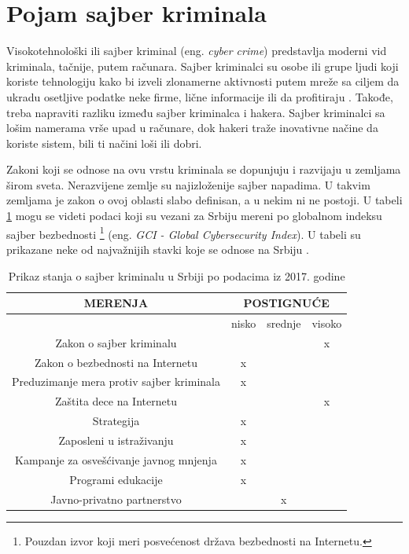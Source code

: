 \documentclass[a4paper]{article}
\theoremstyle{break}
\begin{document}
{\section{Pojam sajber kriminala}
\label{pojam}

Visokotehnološki ili sajber kriminal (eng. {\em cyber crime}) predstavlja moderni vid kriminala, tačnije, putem računara. Sajber kriminalci su osobe ili grupe ljudi koji koriste tehnologiju kako bi izveli zlonamerne aktivnosti putem mreže sa ciljem da ukradu osetljive podatke neke firme, lične informacije ili da profitiraju \cite{sajber}. Takođe, treba napraviti razliku između sajber kriminalca i hakera. Sajber kriminalci sa lošim namerama vrše upad u računare, dok hakeri traže inovativne načine da koriste sistem, bili ti načini loši ili dobri.\\
\par Zakoni koji se odnose na ovu vrstu kriminala se dopunjuju i razvijaju u zemljama širom sveta. Nerazvijene zemlje su najizloženije sajber napadima. U takvim zemljama je zakon o ovoj oblasti slabo definisan, a u nekim ni ne postoji. U tabeli \ref{tab:tabela1} mogu se videti podaci koji su vezani za Srbiju mereni po globalnom indeksu sajber bezbednosti \footnote{Pouzdan izvor koji meri posvećenost država bezbednosti na Internetu.} (eng. {\em GCI - Global Cybersecurity Index}). U tabeli su prikazane neke od najvažnijih stavki koje se odnose na Srbiju \cite{cgi}.


\begin{table}[h]
\begin{center}
\centering
 \begin{tabular}{|c|c|c|c|}
 \hline MERENJA & \multicolumn{3}{|c|}{POSTIGNUĆE} \\
 \hline	 & nisko & srednje & visoko\\
 \hline  Zakon o sajber kriminalu & & &x\\
 \hline Zakon o bezbednosti na Internetu &x & &\\
 \hline Preduzimanje mera protiv sajber kriminala &x & &\\
 \hline Zaštita dece na Internetu & & &x\\
 \hline Strategija &x & &\\
 \hline Zaposleni u istraživanju &x & &\\
 \hline Kampanje za osvešćivanje javnog mnjenja &x & &\\
 \hline Programi edukacije &x & &\\
 \hline Javno-privatno partnerstvo & &x &\\
 \hline 
 \end{tabular}
 \caption{Prikaz stanja o sajber kriminalu u Srbiji po podacima iz 2017. godine}
 \label{tab:tabela1} 
 \end{center}
\end{table}

}
\end{document}
